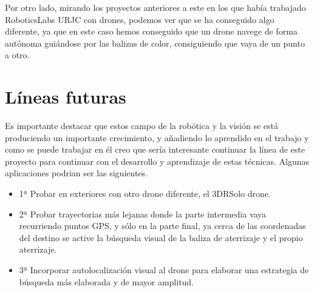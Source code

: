 \hspace{1cm} Por otro lado, mirando los proyectos anteriores a este en los que hab\'ia trabajado RoboticsLabs URJC con drones, podemos ver que se ha conseguido algo diferente, ya que en este caso hemos conseguido que un drone navege de forma aut\'onoma gui\'andose por las balizas de color, consiguiendo que vaya de un punto a otro. 


\section{L\'ineas futuras}

\hspace{1cm}Es importante destacar que estos campo de la rob\'otica y la visi\'on se est\'a produciendo un importante crecimiento, y añadiendo lo aprendido en el trabajo y como se puede trabajar en \'el creo que ser\'ia interesante continuar la l\'inea de este proyecto para continuar con el desarrollo y aprendizaje de estas t\'ecnicas. Algunas aplicaciones podrian ser las siguientes.

\begin{itemize}
\item 1ª Probar en exteriores con otro drone diferente, el 3DRSolo drone.
\item 2ª Probar trayectorias m\'as lejanas donde la parte intermedia vaya recurriendo puntos GPS, y s\'olo en la parte final, ya cerca de las coordenadas del destino se active la b\'usqueda visual de la baliza de aterrizaje y el propio aterrizaje.
\item 3ª Incorporar autolocalizaci\'on visual al drone para elaborar una estrategia de b\'usqueda m\'as elaborada y de mayor amplitud.
\end{itemize}

